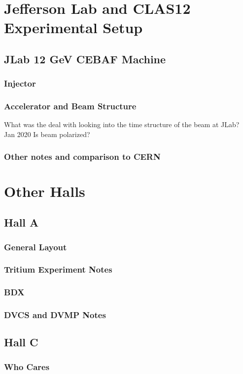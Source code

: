 \chapter{Jefferson Lab and CLAS12 Experimental Setup}
    \section{JLab 12 GeV CEBAF Machine}
        \subsection{Injector}
        \subsection{Accelerator and Beam Structure}
            What was the deal with looking into the time structure of the beam at JLab? Jan 2020
            Is beam polarized?
        \subsection{Other notes and comparison to CERN}
\chapter{Other Halls}
    \section{Hall A}
        \subsection{General Layout}
        \subsection{Tritium Experiment Notes}
        \subsection{BDX}
        \subsection{DVCS and DVMP Notes}
    \section{Hall C}
        \subsection{Who Cares}
